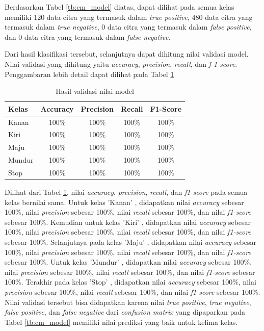Berdasarkan Tabel \ref{tb:cm_model} diatas, dapat dilihat pada semua kelas memiliki 120 data citra yang termasuk dalam \emph{true positive}, 480 data citra yang termasuk dalam \emph{true negative}, 0 data citra yang termasuk dalam \emph{false positive}, dan 0 data citra yang termasuk dalam \emph{false negative}. 

Dari hasil klasifikasi tersebut, selanjutnya dapat dihitung nilai validasi model. Nilai validasi yang dihitung yaitu \emph{accuracy}, \emph{precision}, \emph{recall}, dan \emph{f-1 score}. Penggambaran lebih detail dapat dilihat pada Tabel \ref{tb:vs_model}

\begin{longtable}{|l|c|c|c|c|}
  \caption{Hasil validasi nilai model}
  \label{tb:vs_model} \\
  \hline
  \rowcolor[HTML]{C0C0C0} 
  \textbf{Kelas} & \textbf{Accuracy} & \textbf{Precision} & \textbf{Recall} & \textbf{F1-Score} \\ \hline
  Kanan    & 100\%            & 100\%             & 100\%           & 100\%            \\ \hline
  Kiri     & 100\%          & 100\%           & 100\%           & 100\%           \\ \hline
  Maju      & 100\%          & 100\%           & 100\%          & 100\%          \\ \hline
  Mundur     & 100\%            & 100\%             & 100\%           & 100\%            \\ \hline
  Stop  & 100\%            & 100\%             & 100\%           & 100\%            \\ \hline
\end{longtable}

Dilihat dari Tabel \ref{tb:vs_model}, nilai \emph{accuracy}, \emph{precision}, \emph{recall}, dan \emph{f1-score} pada semua kelas bernilai sama. Untuk kelas 'Kanan' , didapatkan nilai \emph{accuracy} sebesar 100\%, nilai \emph{precision} sebesar 100\%, nilai \emph{recall} sebesar 100\%, dan nilai \emph{f1-score} sebesar 100\%. Kemudian untuk kelas 'Kiri' , didapatkan nilai \emph{accuracy} sebesar 100\%, nilai \emph{precision} sebesar 100\%, nilai \emph{recall} sebesar 100\%, dan nilai \emph{f1-score} sebesar 100\%. Selanjutnya pada kelas 'Maju' , didapatkan nilai \emph{accuracy} sebesar 100\%, nilai \emph{precision} sebesar 100\%, nilai \emph{recall} sebesar 100\%, dan nilai \emph{f1-score} sebesar 100\%. Untuk kelas 'Mundur' , didapatkan nilai \emph{accuracy} sebesar 100\%, nilai \emph{precision} sebesar 100\%, nilai \emph{recall} sebesar 100\%, dan nilai \emph{f1-score} sebesar 100\%. Terakhir pada kelas 'Stop' , didapatkan nilai \emph{accuracy} sebesar 100\%, nilai \emph{precision} sebesar 100\%, nilai \emph{recall} sebesar 100\%, dan nilai \emph{f1-score} sebesar 100\%. Nilai validasi tersebut bisa didapatkan karena nilai \emph{true positive}, \emph{true negative}, \emph{false positive}, dan \emph{false negative} dari \emph{confusion matrix} yang dipaparkan pada Tabel \ref{tb:cm_model} memiliki nilai prediksi yang baik untuk kelima kelas.


